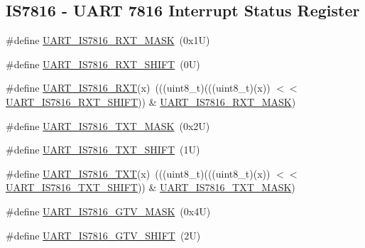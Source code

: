 \subsection*{I\+S7816 -\/ U\+A\+RT 7816 Interrupt Status Register}
\begin{DoxyCompactItemize}
\item 
\#define \mbox{\hyperlink{group___u_a_r_t___register___masks_ga70556c9c160817cdae5da7b0e96d755e}{U\+A\+R\+T\+\_\+\+I\+S7816\+\_\+\+R\+X\+T\+\_\+\+M\+A\+SK}}~(0x1\+U)
\item 
\#define \mbox{\hyperlink{group___u_a_r_t___register___masks_ga189a4242177b8a2ebe2cd216a1fdfb41}{U\+A\+R\+T\+\_\+\+I\+S7816\+\_\+\+R\+X\+T\+\_\+\+S\+H\+I\+FT}}~(0\+U)
\item 
\#define \mbox{\hyperlink{group___u_a_r_t___register___masks_ga2e07a29afc64917b4d040b221e2ea415}{U\+A\+R\+T\+\_\+\+I\+S7816\+\_\+\+R\+XT}}(x)~(((uint8\+\_\+t)(((uint8\+\_\+t)(x)) $<$$<$ \mbox{\hyperlink{group___u_a_r_t___register___masks_ga189a4242177b8a2ebe2cd216a1fdfb41}{U\+A\+R\+T\+\_\+\+I\+S7816\+\_\+\+R\+X\+T\+\_\+\+S\+H\+I\+FT}})) \& \mbox{\hyperlink{group___u_a_r_t___register___masks_ga70556c9c160817cdae5da7b0e96d755e}{U\+A\+R\+T\+\_\+\+I\+S7816\+\_\+\+R\+X\+T\+\_\+\+M\+A\+SK}})
\item 
\#define \mbox{\hyperlink{group___u_a_r_t___register___masks_gae05e13012c95c5f0ebc11ec8a0d474c6}{U\+A\+R\+T\+\_\+\+I\+S7816\+\_\+\+T\+X\+T\+\_\+\+M\+A\+SK}}~(0x2\+U)
\item 
\#define \mbox{\hyperlink{group___u_a_r_t___register___masks_ga460ed2c07230c4c0de6ae3701a1f84f1}{U\+A\+R\+T\+\_\+\+I\+S7816\+\_\+\+T\+X\+T\+\_\+\+S\+H\+I\+FT}}~(1\+U)
\item 
\#define \mbox{\hyperlink{group___u_a_r_t___register___masks_gaa1871af657f4b1ccc1968d276e6f465a}{U\+A\+R\+T\+\_\+\+I\+S7816\+\_\+\+T\+XT}}(x)~(((uint8\+\_\+t)(((uint8\+\_\+t)(x)) $<$$<$ \mbox{\hyperlink{group___u_a_r_t___register___masks_ga460ed2c07230c4c0de6ae3701a1f84f1}{U\+A\+R\+T\+\_\+\+I\+S7816\+\_\+\+T\+X\+T\+\_\+\+S\+H\+I\+FT}})) \& \mbox{\hyperlink{group___u_a_r_t___register___masks_gae05e13012c95c5f0ebc11ec8a0d474c6}{U\+A\+R\+T\+\_\+\+I\+S7816\+\_\+\+T\+X\+T\+\_\+\+M\+A\+SK}})
\item 
\#define \mbox{\hyperlink{group___u_a_r_t___register___masks_ga863b3dbfbf807a29466c8acf12054673}{U\+A\+R\+T\+\_\+\+I\+S7816\+\_\+\+G\+T\+V\+\_\+\+M\+A\+SK}}~(0x4\+U)
\item 
\#define \mbox{\hyperlink{group___u_a_r_t___register___masks_ga522eab69113bfd36e6f58835baa045a8}{U\+A\+R\+T\+\_\+\+I\+S7816\+\_\+\+G\+T\+V\+\_\+\+S\+H\+I\+FT}}~(2\+U)

\end{DoxyCompactItemize}
